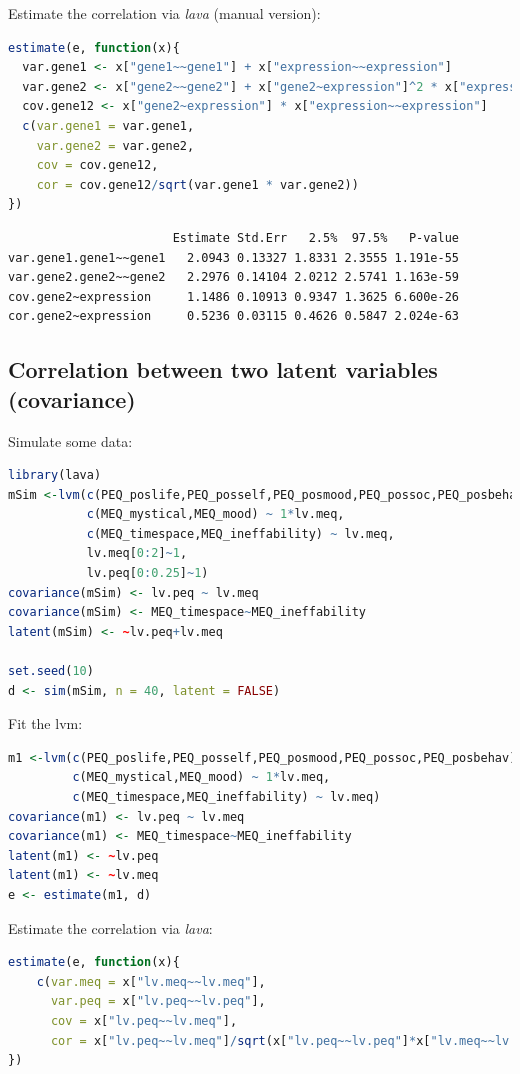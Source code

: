 \documentclass{article}
\begin{document}
Estimate the correlation via \emph{lava} (manual version):
\begin{lstlisting}[language=r,numbers=none]
estimate(e, function(x){
  var.gene1 <- x["gene1~~gene1"] + x["expression~~expression"]
  var.gene2 <- x["gene2~~gene2"] + x["gene2~expression"]^2 * x["expression~~expression"]
  cov.gene12 <- x["gene2~expression"] * x["expression~~expression"]
  c(var.gene1 = var.gene1,
    var.gene2 = var.gene2,
    cov = cov.gene12,
    cor = cov.gene12/sqrt(var.gene1 * var.gene2))
})
\end{lstlisting}

\label{}
\begin{verbatim}
                       Estimate Std.Err   2.5%  97.5%   P-value
var.gene1.gene1~~gene1   2.0943 0.13327 1.8331 2.3555 1.191e-55
var.gene2.gene2~~gene2   2.2976 0.14104 2.0212 2.5741 1.163e-59
cov.gene2~expression     1.1486 0.10913 0.9347 1.3625 6.600e-26
cor.gene2~expression     0.5236 0.03115 0.4626 0.5847 2.024e-63
\end{verbatim}
\subsection{Correlation between two latent variables (covariance)}
\label{sec:orga62614f}

Simulate some data:
\begin{lstlisting}[language=r,numbers=none]
library(lava)
mSim <-lvm(c(PEQ_poslife,PEQ_posself,PEQ_posmood,PEQ_possoc,PEQ_posbehav)~lv.peq,
           c(MEQ_mystical,MEQ_mood) ~ 1*lv.meq,
           c(MEQ_timespace,MEQ_ineffability) ~ lv.meq,
           lv.meq[0:2]~1,
           lv.peq[0:0.25]~1)
covariance(mSim) <- lv.peq ~ lv.meq
covariance(mSim) <- MEQ_timespace~MEQ_ineffability
latent(mSim) <- ~lv.peq+lv.meq

set.seed(10)
d <- sim(mSim, n = 40, latent = FALSE)
\end{lstlisting}

Fit the lvm:
\begin{lstlisting}[language=r,numbers=none]
m1 <-lvm(c(PEQ_poslife,PEQ_posself,PEQ_posmood,PEQ_possoc,PEQ_posbehav)~lv.peq,
         c(MEQ_mystical,MEQ_mood) ~ 1*lv.meq,
         c(MEQ_timespace,MEQ_ineffability) ~ lv.meq)
covariance(m1) <- lv.peq ~ lv.meq
covariance(m1) <- MEQ_timespace~MEQ_ineffability
latent(m1) <- ~lv.peq
latent(m1) <- ~lv.meq
e <- estimate(m1, d)
\end{lstlisting}

Estimate the correlation via \emph{lava}:
\begin{lstlisting}[language=r,numbers=none]
estimate(e, function(x){
    c(var.meq = x["lv.meq~~lv.meq"],
      var.peq = x["lv.peq~~lv.peq"],
      cov = x["lv.peq~~lv.meq"],
      cor = x["lv.peq~~lv.meq"]/sqrt(x["lv.peq~~lv.peq"]*x["lv.meq~~lv.meq"]))
})
\end{lstlisting}
\end{document}
